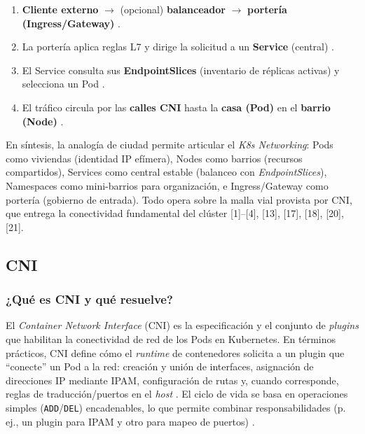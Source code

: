 \documentclass[journal]{IEEEtran}
\begin{document}
\begin{enumerate}
\item \textbf{Cliente externo} $\rightarrow$ (opcional) \textbf{balanceador} $\rightarrow$ \textbf{portería (Ingress/Gateway)} \cite{ref17}.
\item La portería aplica reglas L7 y dirige la solicitud a un \textbf{Service} (central) \cite{ref3,ref13}.
\item El Service consulta sus \textbf{EndpointSlices} (inventario de réplicas activas) y selecciona un Pod \cite{ref1}.
\item El tráfico circula por las \textbf{calles CNI} hasta la \textbf{casa (Pod)} en el \textbf{barrio (Node)} \cite{ref2,ref4,ref18}.
\end{enumerate}

En síntesis, la analogía de ciudad permite articular el \emph{K8s Networking}: Pods como viviendas (identidad IP efímera), Nodes como barrios (recursos compartidos), Services como central estable (balanceo con \emph{EndpointSlices}), Namespaces como mini-barrios para organización, e Ingress/Gateway como portería (gobierno de entrada). Todo opera sobre la malla vial provista por CNI, que entrega la conectividad fundamental del clúster [1]–[4], [13], [17], [18], [20], [21].

\subsection{CNI}

\subsubsection{¿Qué es CNI y qué resuelve?}

El \emph{Container Network Interface} (CNI) es la especificación y el conjunto de \emph{plugins} que habilitan la conectividad de red de los Pods en Kubernetes. En términos prácticos, CNI define cómo el \emph{runtime} de contenedores solicita a un plugin que “conecte” un Pod a la red: creación y unión de interfaces, asignación de direcciones IP mediante IPAM, configuración de rutas y, cuando corresponde, reglas de traducción/puertos en el \emph{host} \cite{ref18,ref4,ref21,ref20}. El ciclo de vida se basa en operaciones simples (\texttt{ADD}/\texttt{DEL}) encadenables, lo que permite combinar responsabilidades (p.\,ej., un plugin para IPAM y otro para mapeo de puertos) \cite{ref18,ref21,ref20}.
\end{document}
